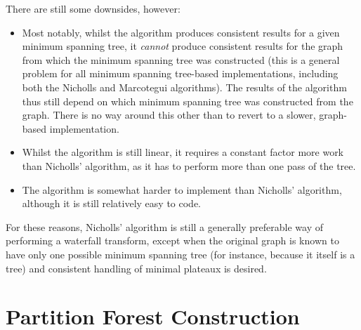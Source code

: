 \newpage

\noindent There are still some downsides, however:
%
\begin{itemize}
\item Most notably, whilst the algorithm produces consistent results for a given minimum spanning tree, it \emph{cannot} produce consistent results for the graph from which the minimum spanning tree was constructed (this is a general problem for all minimum spanning tree-based implementations, including both the Nicholls and Marcotegui algorithms). The results of the algorithm thus still depend on which minimum spanning tree was constructed from the graph. There is no way around this other than to revert to a slower, graph-based implementation.
\item Whilst the algorithm is still linear, it requires a constant factor more work than Nicholls' algorithm, as it has to perform more than one pass of the tree.
\item The algorithm is somewhat harder to implement than Nicholls' algorithm, although it is still relatively easy to code.
\end{itemize}
%
For these reasons, Nicholls' algorithm is still a generally preferable way of performing a waterfall transform, except when the original graph is known to have only one possible minimum spanning tree (for instance, because it itself is a tree) and consistent handling of minimal plateaux is desired.

\section{Partition Forest Construction}

